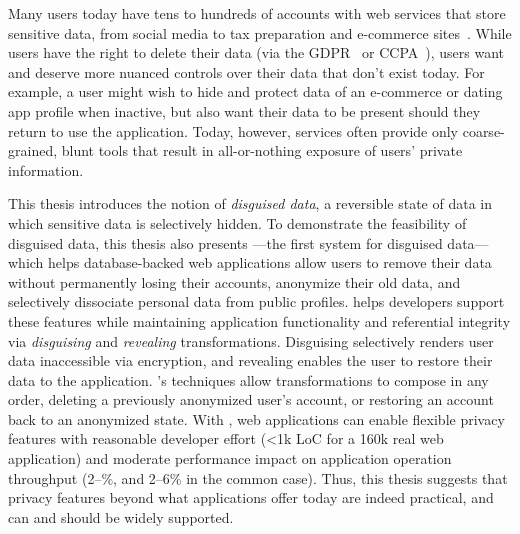 Many users today have tens to hundreds of accounts with web services that store
sensitive data, from social media to tax preparation and e-commerce
sites~\cite{tens,hundreds,password_life_cycle}.
%
While users have the right to delete their data (via \eg the
GDPR~\cite{eu:gdpr} or CCPA~\cite{ccpa}), users want and deserve more nuanced
controls over their data that don't exist today.
%
For example, a user might wish to hide
and protect data of an e-commerce or dating app profile when inactive, but also
want their data to be present should they return to use the application. 
%
Today, however, services often provide only coarse-grained, blunt tools that
result in all-or-nothing exposure of users’ private information.
%

%
This thesis introduces the notion of \emph{disguised data}, a reversible state
of data in which sensitive data is selectively hidden.
%
To demonstrate the feasibility of disguised data, this thesis also presents
\sys---the first system for disguised data---which helps database-backed web applications allow users
to remove their data without permanently losing their accounts, anonymize their
old data, and selectively dissociate personal data from public profiles.
%
\sys helps developers support these features while maintaining application
functionality and referential integrity via \emph{disguising} and
\emph{revealing} transformations.
%
Disguising selectively renders user data inaccessible via encryption, and
revealing enables the user to restore their data to the application.
%
\sys's techniques allow transformations to compose in any order, \eg deleting a
previously anonymized user's account, or restoring an account back to an
anonymized state.
%
With \sys, web applications can enable flexible privacy features with reasonable
developer effort (<1k LoC for a 160k real web application) and moderate
performance impact on application operation throughput (2--\%, and 2--6\% in
the common case).
%
Thus, this thesis suggests that privacy features beyond what applications offer
today are indeed practical, and can and should be widely supported.
%
